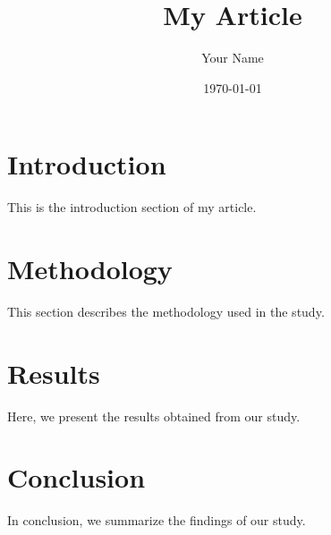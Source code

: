 \documentclass{article}
\title{My Article}
\author{Your Name}
\date{\today}
\begin{document}
\maketitle

\section{Introduction}
This is the introduction section of my article.

\section{Methodology}
This section describes the methodology used in the study.

\section{Results}
Here, we present the results obtained from our study.

\section{Conclusion}
In conclusion, we summarize the findings of our study.
\end{document}
